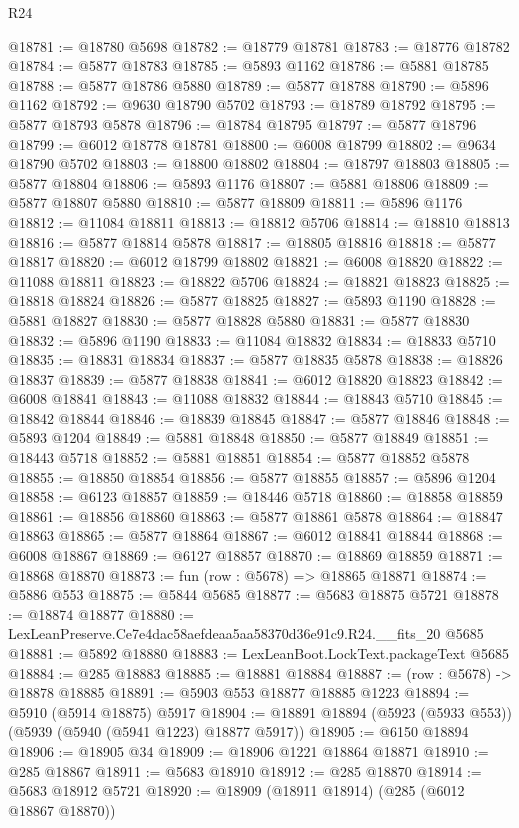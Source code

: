 \begin{lexlean}{R24}
\begin{coremodule}
@18781 := @18780 @5698
@18782 := @18779 @18781
@18783 := @18776 @18782
@18784 := @5877 @18783
@18785 := @5893 @1162
@18786 := @5881 @18785
@18788 := @5877 @18786 @5880
@18789 := @5877 @18788
@18790 := @5896 @1162
@18792 := @9630 @18790 @5702
@18793 := @18789 @18792
@18795 := @5877 @18793 @5878
@18796 := @18784 @18795
@18797 := @5877 @18796
@18799 := @6012 @18778 @18781
@18800 := @6008 @18799
@18802 := @9634 @18790 @5702
@18803 := @18800 @18802
@18804 := @18797 @18803
@18805 := @5877 @18804
@18806 := @5893 @1176
@18807 := @5881 @18806
@18809 := @5877 @18807 @5880
@18810 := @5877 @18809
@18811 := @5896 @1176
@18812 := @11084 @18811
@18813 := @18812 @5706
@18814 := @18810 @18813
@18816 := @5877 @18814 @5878
@18817 := @18805 @18816
@18818 := @5877 @18817
@18820 := @6012 @18799 @18802
@18821 := @6008 @18820
@18822 := @11088 @18811
@18823 := @18822 @5706
@18824 := @18821 @18823
@18825 := @18818 @18824
@18826 := @5877 @18825
@18827 := @5893 @1190
@18828 := @5881 @18827
@18830 := @5877 @18828 @5880
@18831 := @5877 @18830
@18832 := @5896 @1190
@18833 := @11084 @18832
@18834 := @18833 @5710
@18835 := @18831 @18834
@18837 := @5877 @18835 @5878
@18838 := @18826 @18837
@18839 := @5877 @18838
@18841 := @6012 @18820 @18823
@18842 := @6008 @18841
@18843 := @11088 @18832
@18844 := @18843 @5710
@18845 := @18842 @18844
@18846 := @18839 @18845
@18847 := @5877 @18846
@18848 := @5893 @1204
@18849 := @5881 @18848
@18850 := @5877 @18849
@18851 := @18443 @5718
@18852 := @5881 @18851
@18854 := @5877 @18852 @5878
@18855 := @18850 @18854
@18856 := @5877 @18855
@18857 := @5896 @1204
@18858 := @6123 @18857
@18859 := @18446 @5718
@18860 := @18858 @18859
@18861 := @18856 @18860
@18863 := @5877 @18861 @5878
@18864 := @18847 @18863
@18865 := @5877 @18864
@18867 := @6012 @18841 @18844
@18868 := @6008 @18867
@18869 := @6127 @18857
@18870 := @18869 @18859
@18871 := @18868 @18870
@18873 := fun (row : @5678) => @18865 @18871
@18874 := @5886 @553
@18875 := @5844 @5685
@18877 := @5683 @18875 @5721
@18878 := @18874 @18877
@18880 := LexLeanPreserve.Ce7e4dac58aefdeaa5aa58370d36e91c9.R24.__fits_20 @5685
@18881 := @5892 @18880
@18883 := LexLeanBoot.LockText.packageText @5685
@18884 := @285 @18883
@18885 := @18881 @18884
@18887 := (row : @5678) -> @18878 @18885
@18891 := @5903 @553 @18877 @18885 @1223
@18894 := @5910 (@5914 @18875) @5917
@18904 := @18891 @18894 (@5923 (@5933 @553)) (@5939 (@5940 (@5941 @1223) @18877 @5917))
@18905 := @6150 @18894
@18906 := @18905 @34
@18909 := @18906 @1221 @18864 @18871
@18910 := @285 @18867
@18911 := @5683 @18910
@18912 := @285 @18870
@18914 := @5683 @18912 @5721
@18920 := @18909 (@18911 @18914) (@285 (@6012 @18867 @18870))

\end{coremodule}
\end{lexlean}
